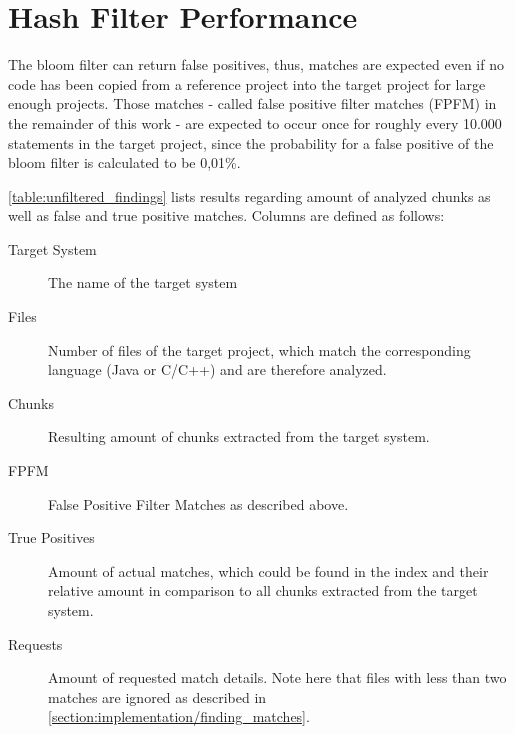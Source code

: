 \section{Hash Filter Performance}\label{section:evaluation/hash_filter_performance}
The bloom filter can return false positives, thus, matches are expected even if no code has been copied from a reference project into the target project for large enough projects.
Those matches - called false positive filter matches (FPFM) in the remainder of this work - are expected to occur once for roughly every 10.000 statements in the target project, since the probability for a false positive of the bloom filter is calculated to be 0,01\%. 

\autoref{table:unfiltered_findings} lists results regarding amount of analyzed chunks as well as false and true positive matches.
Columns are defined as follows:
\begin{description}
	\item[Target System] The name of the target system
	\item[Files] Number of files of the target project, which match the corresponding language (Java or C/C++) and are therefore analyzed.
	\item[Chunks] Resulting amount of chunks extracted from the target system.
	\item[FPFM] False Positive Filter Matches as described above.
	\item[True Positives] Amount of actual matches, which could be found in the index and their relative amount in comparison to all chunks extracted from the target system.
	\item[Requests] Amount of requested match details. Note here that files with less than two matches are ignored as described in \autoref{section:implementation/finding_matches}.
\end{description}

